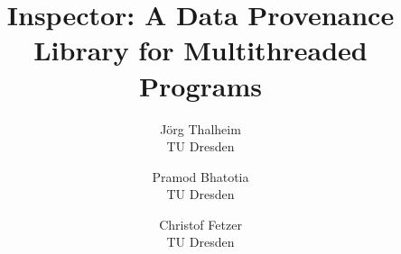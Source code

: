 \documentclass[letterpaper,twocolumn,10pt]{article}
\begin{document}
\title{Inspector: A Data Provenance Library for Multithreaded Programs}

\author{
\parbox{1.5in}{
\centerline{J\"{o}rg Thalheim}
\centerline{TU Dresden}
}
\and
\parbox{1.5in}{
\centerline{Pramod Bhatotia}
\centerline{TU Dresden}
}
\and
\parbox{1.5in}{
\centerline{Christof Fetzer}
\centerline{TU Dresden}
}
}


\maketitle
\thispagestyle{empty}















 
\end{document}
